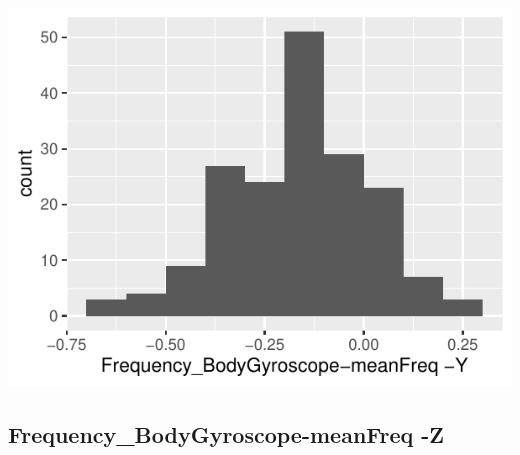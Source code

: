 \documentclass[
]{article}
\begin{document}
\begin{minipage}{0.25 \textwidth}

\includegraphics{codebook_tidydatasub_files/figure-latex/Var-68-Frequency-BodyGyroscope-meanFreq--Y-1.pdf}

\end{minipage}

\noindent\makebox[\linewidth]{\rule{\textwidth}{0.4pt}}

\hypertarget{frequency_bodygyroscope-meanfreq--z}{%
\subsection{Frequency\_BodyGyroscope-meanFreq
-Z}\label{frequency_bodygyroscope-meanfreq--z}}
\end{document}

